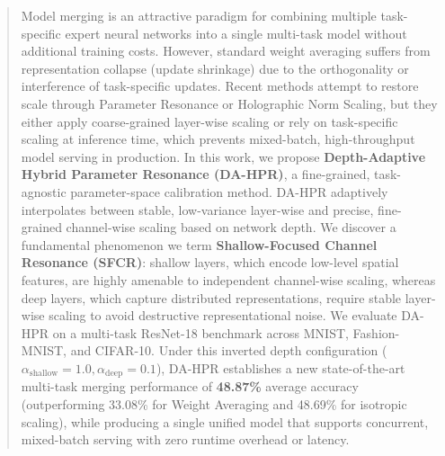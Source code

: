 \documentclass{article}
\theoremstyle{plain}
\theoremstyle{definition}
\theoremstyle{remark}
\begin{document}

\printAffiliationsAndNotice{}  %

\begin{abstract}
Model merging is an attractive paradigm for combining multiple task-specific expert neural networks into a single multi-task model without additional training costs. However, standard weight averaging suffers from representation collapse (update shrinkage) due to the orthogonality or interference of task-specific updates. Recent methods attempt to restore scale through Parameter Resonance or Holographic Norm Scaling, but they either apply coarse-grained layer-wise scaling or rely on task-specific scaling at inference time, which prevents mixed-batch, high-throughput model serving in production.
In this work, we propose \textbf{Depth-Adaptive Hybrid Parameter Resonance (DA-HPR)}, a fine-grained, task-agnostic parameter-space calibration method. DA-HPR adaptively interpolates between stable, low-variance layer-wise and precise, fine-grained channel-wise scaling based on network depth. 
We discover a fundamental phenomenon we term \textbf{Shallow-Focused Channel Resonance (SFCR)}: shallow layers, which encode low-level spatial features, are highly amenable to independent channel-wise scaling, whereas deep layers, which capture distributed representations, require stable layer-wise scaling to avoid destructive representational noise.
We evaluate DA-HPR on a multi-task ResNet-18 benchmark across MNIST, Fashion-MNIST, and CIFAR-10. Under this inverted depth configuration ($\alpha_{\text{shallow}}=1.0, \alpha_{\text{deep}}=0.1$), DA-HPR establishes a new state-of-the-art multi-task merging performance of \textbf{48.87\%} average accuracy (outperforming 33.08\% for Weight Averaging and 48.69\% for isotropic scaling), while producing a single unified model that supports concurrent, mixed-batch serving with zero runtime overhead or latency.
\end{abstract}
\end{document}
